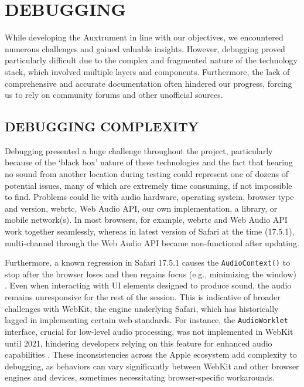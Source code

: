 \documentclass[fleqn]{jaes}
\begin{document}
\section{DEBUGGING}
While developing the Auxtrument in line with our objectives, we encountered numerous challenges and gained valuable insights. However, debugging proved particularly difficult due to the complex and fragmented nature of the technology stack, which involved multiple layers and components. Furthermore, the lack of comprehensive and accurate documentation often hindered our progress, forcing us to rely on community forums and other unofficial sources.

\subsection{DEBUGGING COMPLEXITY}
Debugging presented a huge challenge throughout the project, particularly because of the `black box' nature of these technologies and the fact that hearing no sound from another location during testing could represent one of dozens of potential issues, many of which are extremely time consuming, if not impossible to find. Problems could lie with audio hardware, operating system, browser type and version, \gls{webrtc}, Web Audio API, our own implementation, a library, or mobile network(s). In most browsers, for example, \gls{webrtc} and Web Audio API work together seamlessly, whereas in latest version of Safari at the time (17.5.1), multi-channel through the Web Audio API became non-functional after updating.

Furthermore, a known regression in Safari 17.5.1 causes the \texttt{AudioContext()} to stop after the browser loses and then regains focus (e.g., minimizing the window) \cite{WebKitBug276016}. Even when interacting with UI elements designed to produce sound, the audio remains unresponsive for the rest of the session. This is indicative of broader challenges with WebKit, the engine underlying Safari, which has historically lagged in implementing certain web standards. For instance, the \texttt{AudioWorklet} interface, crucial for low-level audio processing, was not implemented in WebKit until 2021, hindering developers relying on this feature for enhanced audio capabilities \cite{MDNAudioWorkletNode}. These inconsistencies across the Apple ecosystem add complexity to debugging, as behaviors can vary significantly between WebKit and other browser engines and devices, sometimes necessitating browser-specific workarounds.
\end{document}
